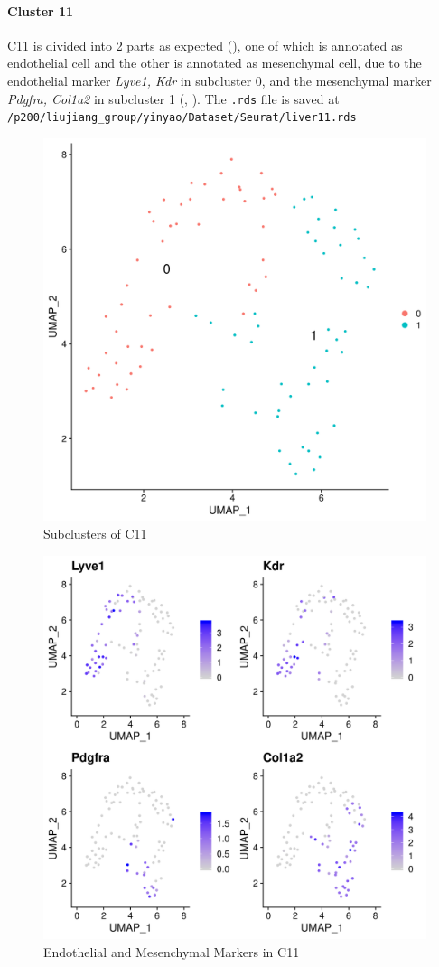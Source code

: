 \documentclass[lang=en]{elegantpaper}
\begin{document}
\paragraph{Cluster 11} C11 is divided into 2 parts as expected (), one of which is annotated as endothelial cell and the other is annotated as mesenchymal cell, due to the endothelial marker \emph{Lyve1, Kdr}\citep{gordillo_orchestrating_2015} in subcluster 0, and the mesenchymal marker \emph{Pdgfra, Col1a2}\citep{han_mapping_2018} in subcluster 1 (, ). The \lstinline{.rds} file is saved at \lstinline{/p200/liujiang_group/yinyao/Dataset/Seurat/liver11.rds}

\begin{figure}[htbp]
    \centering
    \includegraphics[width=0.6\linewidth]{image/d11.png}
    \caption{Subclusters of C11 \label{d11}}
\end{figure}
\begin{figure}[htbp]
    \centering
    \includegraphics[width=0.6\linewidth]{image/f11.png}
    \caption{Endothelial and Mesenchymal Markers in C11 \label{f11}}
\end{figure}
\end{document}
